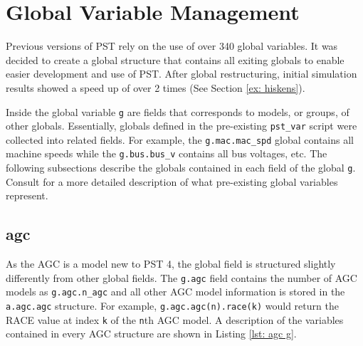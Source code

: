 \pagebreak
\section{Global Variable Management}  
Previous versions of PST rely on the use of over 340 global variables.
It was decided to create a global structure that contains all exiting globals to enable easier development and use of PST.
After global restructuring, initial simulation results showed a speed up of over 2 times (See Section \ref{ex: hiskens}).


Inside the global variable \verb|g| are fields that corresponds to models, or groups, of other globals.
Essentially, globals defined in the pre-existing \verb|pst_var| script were collected into related fields.
For example, the \verb|g.mac.mac_spd| global contains all machine speeds while the \verb|g.bus.bus_v| contains all bus voltages, etc.
The following subsections describe the globals contained in each field of the global \verb|g|. 
Consult \cite{PST3manual} for a more detailed description of what pre-existing global variables represent.

\pagebreak
\subsection{agc}  
As the AGC is a model new to PST 4, the global field is structured slightly differently from other global fields.
The \verb|g.agc| field contains the number of AGC models as \verb|g.agc.n_agc| and all other AGC model information is stored in the \verb|a.agc.agc| structure.
For example, \verb|g.agc.agc(n).race(k)| would return the RACE value at index \verb|k| of the \verb|n|th AGC model.
A description of the variables contained in every AGC structure are shown in Listing \ref{lst: agc g}.

